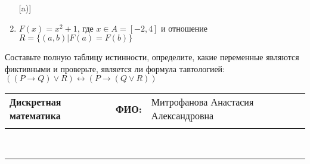 \documentclass[10pt]{exam}
\newcommand{\class}{Дискретная математика}
\newcommand{\examdate}{}
\begin{document}
\begin{questions}
\begin{enumerate} [a)]
\item $F(x)=x^{2}+1$, где $x \in A = [-2, 4]$ и отношение $R = \{(a,b)|F(a) = F(b)\}$
\end{enumerate}\question Составьте полную таблицу истинности, определите, какие переменные являются фиктивными и проверьте, является ли формула тавтологией:
$((P \rightarrow Q) \lor R) \leftrightarrow (P \rightarrow (Q \lor R))$

\end{questions}
\newpage
\begin{flushright}
\begin{tabular}{p{2.8in} r l}
\textbf{\class} & \textbf{ФИО:} &Митрофанова Анастасия Александровна
\\

\textbf{\examdate} &&\\
\end{tabular}\\
\end{flushright}
\rule[1ex]{\textwidth}{.1pt}
\end{document}

